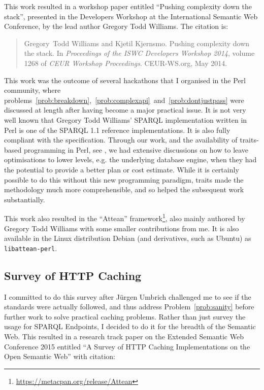 This work resulted in a workshop paper entitled ``Pushing complexity
down the stack'', presented in the Developers Workshop at the
International Semantic Web Conference, by the lead author Gregory Todd
Williams. The citation is:

\begin{quote}
Gregory~Todd Williams and Kjetil Kjernsmo.
\newblock Pushing complexity down the stack.
\newblock In {\em Proceedings of the ISWC Developers Workshop 2014}, volume
  1268 of {\em {CEUR} Workshop Proceedings}. CEUR-WS.org, May 2014.
\end{quote}


This work was the outcome of several hackathons that I organised in
the Perl community, where
problems~\ref{prob:breakdown},~\ref{prob:complexapi}~and~\ref{prob:dontjustpass}
were discussed at length after having become a major practical
issue. It is not very well known that Gregory Todd Williams' SPARQL
implementation written in Perl is one of the SPARQL 1.1 reference
implementations. It is also fully compliant with the
specification. Through our work, and the availability of traits-based
programming in Perl, see \cite{traits}, we had extensive discussions
on how to leave optimisations to lower levels, e.g. the underlying
database engine, when they had the potential to provide a better plan
or cost estimate. While it is certainly possible to do this without
this new programming paradigm, traits made the methodology much more
comprehensible, and so helped the subsequent work substantially.

This work also resulted in the ``Attean''
framework\footnote{\url{https://metacpan.org/release/Attean}}, also
mainly authored by Gregory Todd Williams with some smaller
contributions from me. It is also available in the Linux distribution
Debian (and derivatives, such as Ubuntu) as \texttt{libattean-perl}.

\subsection{Survey of HTTP Caching}\label{sec:consanity}

I committed to do this survey after Jürgen Umbrich challenged me to see
if the standards were actually followed, and thus address
Problem~\ref{prob:sanity} before further work to solve practical
caching problems. Rather than just survey the
usage for SPARQL Endpoints, I decided to do it for the breadth of the
Semantic Web. This resulted in a research track paper on the Extended
Semantic Web Conference 2015 entitled ``A Survey of HTTP Caching
Implementations on the Open Semantic Web'' with citation:

